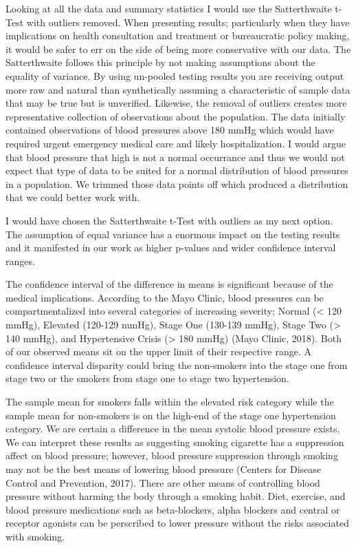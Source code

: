 \documentclass[
]{article}
\begin{document}
Looking at all the data and summary statistics I would use the
Satterthwaite t-Test with outliers removed. When presenting results;
particularly when they have implications on health consultation and
treatment or bureaucratic policy making, it would be safer to err on the
side of being more conservative with our data. The Satterthwaite follows
this principle by not making assumptions about the equality of variance.
By using un-pooled testing results you are receiving output more raw and
natural than synthetically assuming a characteristic of sample data that
may be true but is unverified. Likewise, the removal of outliers creates
more representative collection of observations about the population. The
data initially contained observations of blood pressures above 180 mmHg
which would have required urgent emergency medical care and likely
hospitalization. I would argue that blood pressure that high is not a
normal occurrance and thus we would not expect that type of data to be
suited for a normal distribution of blood pressures in a population. We
trimmed those data points off which produced a distribution that we
could better work with.

I would have chosen the Satterthwaite t-Test with outliers as my next
option. The assumption of equal variance has a enormous impact on the
testing results and it manifested in our work as higher p-values and
wider confidence interval ranges.

The confidence interval of the difference in means is significant
because of the medical implications. According to the Mayo Clinic, blood
pressures can be compartmentalized into several categories of increasing
severity; Normal (\textless{} 120 mmHg), Elevated (120-129 mmHg), Stage
One (130-139 mmHg), Stage Two (\textgreater{} 140 mmHg), and
Hypertensive Crisis (\textgreater{} 180 mmHg) (Mayo Clinic, 2018). Both
of our observed means sit on the upper limit of their respective range.
A confidence interval disparity could bring the non-smokers into the
stage one from stage two or the smokers from stage one to stage two
hypertension.

The sample mean for smokers falls within the elevated risk category
while the sample mean for non-smokers is on the high-end of the stage
one hypertension category. We are certain a difference in the mean
systolic blood pressure exists. We can interpret these results as
suggesting smoking cigarette has a suppression affect on blood pressure;
however, blood pressure suppression through smoking may not be the best
means of lowering blood pressure (Centers for Disease Control and
Prevention, 2017). There are other means of controlling blood pressure
without harming the body through a smoking habit. Diet, exercise, and
blood pressure medications such as beta-blockers, alpha blockers and
central or receptor agonists can be perscribed to lower pressure without
the risks associated with smoking.\\
~\\
\end{document}
